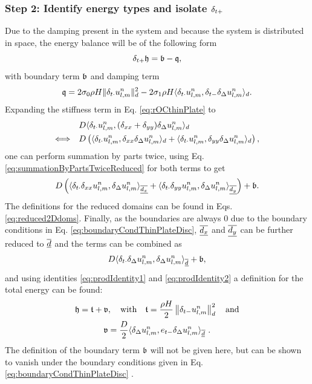 {\subsubsection{Step 2: Identify energy types and isolate $\delta_{t+}$}
Due to the damping present in the system and because the system is distributed in space, the energy balance will be of the following form
\begin{equation*}
    \delta_{t+} \mathfrak{h} = \mathfrak{b}-\mathfrak{q}, 
\end{equation*}
with boundary term $\mathfrak{b}$ and damping term
\begin{equation}\label{eq:dampingTermThinPlate}
    \mathfrak{q} = 2\sigma_{0} \rho H \lVert\delta_{t\cdot}u_{l,m}^n\rVert_d^2 - 2 \sigma_{1} \rho H \langle \delta_{t\cdot} u_{l,m}^n, \delta_{t-} \delta_{\Delta}u_{l,m}^n \rangle_d.
\end{equation}
Expanding the stiffness term in Eq. \eqref{eq:rOCthinPlate} to
\begin{align*}
    &\ D\langle \delta_{t\cdot} u_{l,m}^n, (\delta_{xx} + \delta_{yy})\delta_{\Delta} u_{l,m}^n \rangle_d\\
    \Longleftrightarrow\ \ &\ D\left(\langle \delta_{t\cdot} u_{l,m}^n, \delta_{xx}\delta_{\Delta} u_{l,m}^n \rangle_d + \langle \delta_{t\cdot} u_{l,m}^n, \delta_{yy}\delta_{\Delta} u_{l,m}^n \rangle_d\right),
\end{align*} 
one can perform summation by parts twice, using Eq. \eqref{eq:summationByPartsTwiceReduced} for both terms to get
\begin{equation*}
    D\left(\langle \delta_{t\cdot} \delta_{xx}u_{l,m}^n, \delta_{\Delta} u_{l,m}^n \rangle_{\underline{\overline{d_x}}} + \langle \delta_{t\cdot}\delta_{yy} u_{l,m}^n, \delta_{\Delta} u_{l,m}^n \rangle_{\underline{\overline{d_y}}}\right) + \mathfrak{b}.
\end{equation*}
The definitions for the reduced domains can be found in Eqs. \eqref{eq:reduced2Ddoms}. Finally, as the boundaries are always $0$ due to the boundary conditions in Eq. \eqref{eq:boundaryCondThinPlateDisc}, $\underline{\overline{d_x}}$ and $\underline{\overline{d_y}}$ can be further reduced to $\underline{\overline{d}}$ and the terms can be combined as 
\begin{equation*}
    D\langle \delta_{t\cdot}\delta_{\Delta}u_{l,m}^n, \delta_{\Delta} u_{l,m}^n \rangle_{\underline{\overline{d}}} + \mathfrak{b} ,
\end{equation*}
and using identities \eqref{eq:prodIdentity1} and \eqref{eq:prodIdentity2} a definition for the total energy can be found:
\begin{equation}\label{eq:energyBalanceThinPlate}
    \begin{gathered}
        \mathfrak{h} = \mathfrak{t} + \mathfrak{v}, \quad \text{with} \quad \mathfrak{t} = \frac{\rho H}{2} \left\lVert\delta_{t-}u_{l,m}^n\right\rVert_{d}^2 \quad \text{and} \\
        \mathfrak{v} = \frac{D}{2}\langle\delta_{\Delta} u_{l,m}^n, e_{t-}\delta_{\Delta} u_{l,m}^n\rangle_{\overline{\underline{d}}}\ .
    \end{gathered}
\end{equation}
The definition of the boundary term $\mathfrak{b}$ will not be given here, but can be shown to vanish under the boundary conditions given in Eq. \eqref{eq:boundaryCondThinPlateDisc} \cite{theBible}.

}
